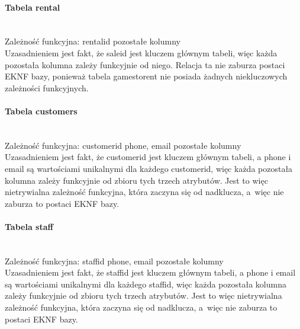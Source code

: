 \documentclass{article}
\begin{document}
	\paragraph{Tabela rental}\mbox{}\vspace{0.2cm} \\
	Zależność funkcyjna: rental\textunderscore id\mbox{} \textrightarrow \mbox{} pozostałe kolumny \vspace{0.2cm} \\
	\noindent Uzasadnieniem jest fakt, że sale\textunderscore id jest kluczem głównym tabeli, więc każda pozostała kolumna zależy funkcyjnie od niego. Relacja ta nie zaburza postaci EKNF bazy, ponieważ tabela games\textunderscore to\textunderscore rent nie posiada żadnych niekluczowych zależności funkcyjnych.
	
	\paragraph{Tabela customers}\mbox{}\vspace{0.2cm} \\
	Zależność funkcyjna: \textbraceleft customer\textunderscore id phone, email\textbraceright \mbox{} \textrightarrow \mbox{} pozostałe kolumny \vspace{0.2cm} \\
	\noindent Uzasadnieniem jest fakt, że customer\textunderscore id jest kluczem głównym tabeli, a phone i email są wartościami unikalnymi dla każdego customer\textunderscore id, więc każda pozostała kolumna zależy funkcyjnie od zbioru tych trzech atrybutów. Jest to więc nietrywialna zależność funkcyjna, która zaczyna się od nadklucza, a~więc nie zaburza to postaci EKNF bazy.
	
	\paragraph{Tabela staff}\mbox{}\vspace{0.2cm} \\
	Zależność funkcyjna: \textbraceleft staff\textunderscore id phone, email\textbraceright \mbox{} \textrightarrow \mbox{} pozostałe kolumny \vspace{0.2cm} \\
	\noindent Uzasadnieniem jest fakt, że staff\textunderscore id jest kluczem głównym tabeli, a phone i email są wartościami unikalnymi dla każdego staff\textunderscore id, więc każda pozostała kolumna zależy funkcyjnie od zbioru tych trzech atrybutów. Jest to więc nietrywialna zależność funkcyjna, która zaczyna się od nadklucza, a~więc nie zaburza to postaci EKNF bazy.
	
\end{document}
